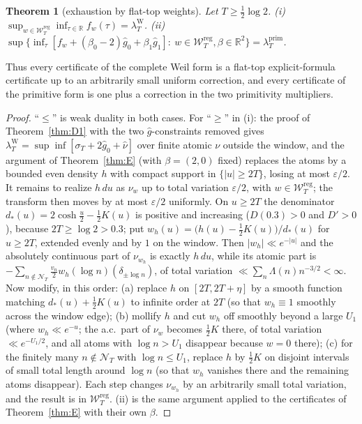 \documentclass[11pt]{amsart}
\newtheorem{theorem}{Theorem}[section]
\theoremstyle{definition}
\theoremstyle{remark}
\newcommand{\R}{\mathbb R}
\newcommand{\lamP}{\lambda^{\mathrm{prim}}_T}
\newcommand{\lamW}{\lambda^{\mathrm W}_T}
\newcommand{\sT}{\sigma_T}
\newcommand{\gh}[1]{\widehat g_{#1}}
\newcommand{\nuh}{\widehat\nu}
\newcommand{\Wcl}{\mathcal W_T}
\newcommand{\NT}{\mathcal N_T}
\begin{document}
\begin{theorem}[exhaustion by flat-top weights]\label{thm:Zexh}
Let $T\ge\frac12\log2$. \emph{(i)} $\sup_{w\in\Wcl^{\mathrm{reg}}}\inf_{\tau\in\R}f_w(\tau)=\lamW$.
\emph{(ii)} $\sup\{\inf_\tau[f_w+(\beta_0-2)\gh0+\beta_1\gh1]:\ w\in\Wcl^{\mathrm{reg}},\beta\in\R^2\}=\lamP$.
\end{theorem}
Thus every certificate of the complete Weil form is a flat-top explicit-formula certificate up to
an arbitrarily small uniform correction, and every certificate of the primitive form is one plus a
correction in the two primitivity multipliers.
\begin{proof}
``$\le$'' is weak duality in both cases. For ``$\ge$'' in (i): the proof of Theorem~\ref{thm:D1}
with the two $\widehat g$-constraints removed gives $\lamW=\sup\inf[\sT+2\gh0+\nuh]$ over finite
atomic $\nu$ outside the window, and the argument of Theorem~\ref{thm:E} (with $\beta=(2,0)$
fixed) replaces the atoms by a bounded even density $h$ with compact support in $\{|u|\ge2T\}$,
losing at most $\varepsilon/2$. It remains to realize $h\,du$ as $\nu_w$ up to total variation
$\varepsilon/2$, with $w\in\Wcl^{\mathrm{reg}}$; the transform then moves by at most $\varepsilon/2$
uniformly. On $u\ge2T$ the denominator $d_*(u)=2\cosh\frac u2-\frac12K(u)$ is positive and increasing
($D(0.3)>0$ and $D'>0$), because $2T\ge\log2>0.3$; put
$w_h(u)=\big(h(u)-\tfrac12K(u)\big)/d_*(u)$ for $u\ge2T$, extended evenly and by $1$ on the window.
Then $|w_h|\ll e^{-|u|}$ and the absolutely continuous part of $\nu_{w_h}$ is exactly $h\,du$, while
its atomic part is $-\sum_{n\notin\NT}\frac{v_n}2w_h(\log n)(\delta_{\pm\log n})$, of total variation
$\ll\sum_n\Lambda(n)n^{-3/2}<\infty$. Now modify, in this order: (a) replace $h$ on $[2T,2T+\eta]$
by a smooth function matching $d_*(u)+\frac12K(u)$ to infinite order at $2T$ (so that $w_h\equiv1$
smoothly across the window edge); (b) mollify $h$ and cut $w_h$ off smoothly beyond a large $U_1$
(where $w_h\ll e^{-u}$; the a.c.\ part of $\nu_w$ becomes $\frac12K$ there, of total variation
$\ll e^{-U_1/2}$, and all atoms with $\log n>U_1$ disappear because $w=0$ there); (c) for the finitely
many $n\notin\NT$ with $\log n\le U_1$, replace $h$ by $\frac12K$ on disjoint intervals of small total
length around $\log n$ (so that $w_h$ vanishes there and the remaining atoms disappear). Each step
changes $\nu_{w_h}$ by an arbitrarily small total variation, and the result is in
$\Wcl^{\mathrm{reg}}$. (ii) is the same argument applied to the certificates of Theorem~\ref{thm:E}
with their own $\beta$.
\end{proof}
\end{document}
